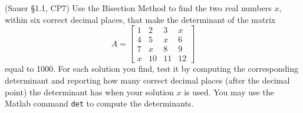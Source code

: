 \documentclass[12pt,fleqn]{exam}
\begin{document}
\begin{questions}
\question (Sauer \S1.1, CP7) Use the Bisection Method to find the two real numbers $x$, within six correct decimal places, that make the determinant of the matrix
\[A = \begin{bmatrix}
1 & 2 & 3 & x \\
4 & 5 & x & 6 \\
7 & x & 8 & 9 \\
x & 10 & 11 & 12
\end{bmatrix}\]
equal to 1000. For each solution you find, test it by computing the corresponding determinant and reporting how many correct decimal places (after the decimal point) the determinant has when your solution $x$ is used. You may use the Matlab command \verb$det$ to compute the determinants.

\end{questions}
\end{document}
